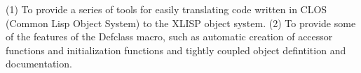 
\hfuzz=5pt


\beginMotivationDesc
 (1) To provide a series of tools for easily
  translating code written in CLOS (Common Lisp Object System) to the
  XLISP object system.  (2) To provide some of the features of the
  Defclass macro, such as automatic creation of accessor functions and
  initialization functions and tightly coupled object defintition and
  documentation. 
\endMotivationDesc
{}
\projectReviewer{ }{ }
\endProject

